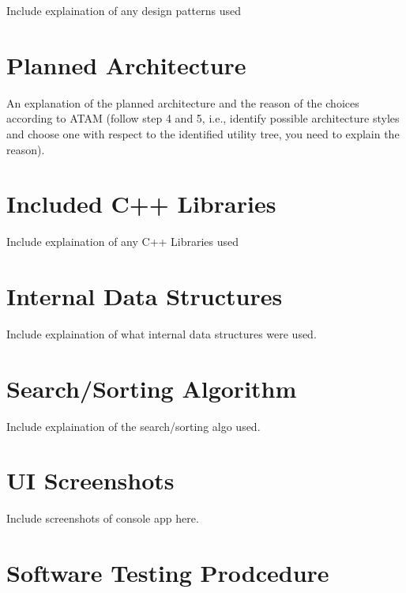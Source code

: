 \documentclass[
  english,
  a4paper,
,tablecaptionabove
]{scrartcl}
\begin{document}
Include explaination of any design patterns used

\newpage

\hypertarget{planned-architecture}{%
\section{Planned Architecture}\label{planned-architecture}}

An explanation of the planned architecture and the reason of the choices
according to ATAM (follow step 4 and 5, i.e., identify possible
architecture styles and choose one with respect to the identified
utility tree, you need to explain the reason).

\newpage

\hypertarget{included-c-libraries}{%
\section{Included C++ Libraries}\label{included-c-libraries}}

Include explaination of any C++ Libraries used

\newpage

\hypertarget{internal-data-structures}{%
\section{Internal Data Structures}\label{internal-data-structures}}

Include explaination of what internal data structures were used.

\newpage

\hypertarget{searchsorting-algorithm}{%
\section{Search/Sorting Algorithm}\label{searchsorting-algorithm}}

Include explaination of the search/sorting algo used.

\newpage

\hypertarget{ui-screenshots}{%
\section{UI Screenshots}\label{ui-screenshots}}

Include screenshots of console app here.

\newpage

\hypertarget{software-testing-prodcedure}{%
\section{Software Testing
Prodcedure}\label{software-testing-prodcedure}}
\end{document}
